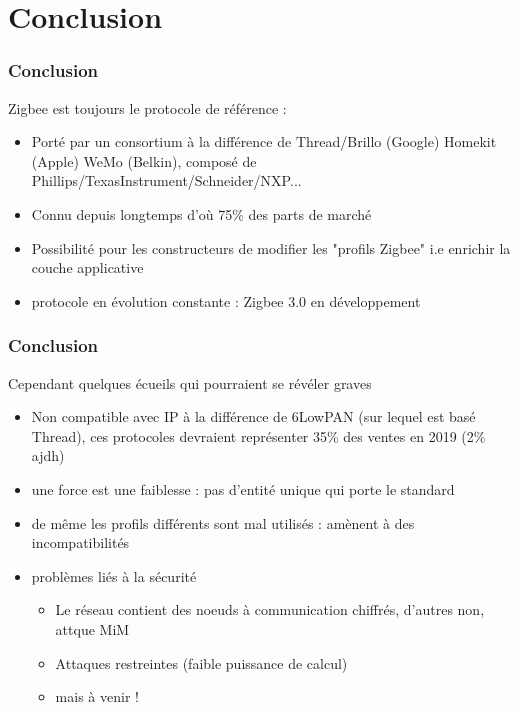 \documentclass{beamer}
\begin{document}
  
  \section{Conclusion}

  \begin{frame}
    \frametitle{Conclusion}
    \begin{block}{Zigbee est toujours le protocole de référence :}
      \begin{itemize}
	\item Porté par un consortium à la différence de Thread/Brillo (Google) Homekit (Apple) WeMo (Belkin), composé de Phillips/TexasInstrument/Schneider/NXP...
	\item Connu depuis longtemps d'où 75\% des parts de marché
	\item Possibilité pour les constructeurs de modifier les "profils Zigbee" i.e enrichir la couche applicative
	\item protocole en évolution constante : Zigbee 3.0 en développement
      \end{itemize}  
    \end{block}
  \end{frame}
  

  \begin{frame}
    \frametitle{Conclusion}
    \begin{block}{Cependant quelques écueils qui pourraient se révéler graves}
      \begin {itemize}
	\item Non compatible avec IP à la différence de 6LowPAN (sur lequel est basé Thread), ces protocoles devraient représenter 35\% des ventes en 2019 (2\% ajdh)
	\item une force est une faiblesse : pas d'entité unique qui porte le standard 
	\item de même les profils différents sont mal utilisés : amènent à des incompatibilités
	\item problèmes liés à la sécurité
	\begin{itemize}
	  \item Le réseau contient des noeuds à communication chiffrés, d'autres non, attque MiM
	  \item Attaques restreintes (faible puissance de calcul)
	  \item mais à venir !
	\end{itemize}
      \end{itemize}
    \end{block}
  \end{frame}  
\end{document}
